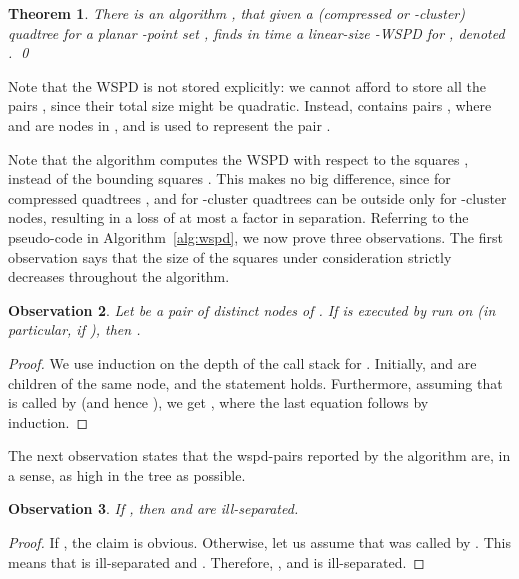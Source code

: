 \documentclass[11pt]{paper}
\newtheorem {theorem} {Theorem}[section]
\newtheorem {observation}[theorem] {Observation}
\begin{document}
    \begin{theorem}\label{thm:wspd}
       There is an algorithm \emph{}, that given a 
       (compressed or -cluster) 
       quadtree  for a planar -point set , finds in time 
       a linear-size -WSPD for , denoted \emph{}.
       \qed
    \end{theorem}


    Note that the WSPD is not stored explicitly: we cannot afford to
    store all the pairs , since their total size might be
    quadratic. Instead,  contains pairs , where 
    and  are nodes in , and   is used to represent
    the pair . 



    Note that the algorithm computes the WSPD with respect to the squares
    , instead of the bounding squares . This makes no big difference,
    since for compressed quadtrees , and for
    -cluster quadtrees  can be outside  only for
    -cluster nodes, resulting in a loss of at most a factor 
    in separation. 
    Referring to the pseudo-code in Algorithm~\ref{alg:wspd}, 
    we now prove three observations. The first observation says
    that the size of the squares under consideration strictly 
    decreases throughout the algorithm.

    \begin{observation} \label{obs:parents-bigger}
    Let  be a pair of distinct nodes of . If 
    \emph{}
    is executed by \emph{} run
    on  (in particular, if \emph{}),
    then .
    \end{observation}


    \begin{proof}
    We use induction on the depth of the call stack for
    . Initially,  and  are children 
    of the same node, and the statement holds.
    Furthermore, assuming that  is called by
     (and hence ), we get
    ,
    where the last equation follows by induction.
    \end{proof}

    The next observation states that the wspd-pairs reported by the
    algorithm are, in a sense, as high in the tree as possible.
    \begin{observation}\label{obs:parents-not-ws}
    If \emph{},
    then  and  are ill-separated.
    \end{observation}

    \begin{proof}
    If , the claim is obvious. Otherwise, let us assume
    that  was  called by . This means
    that  is ill-separated and
    .
    Therefore, 
    ,  and  is ill-separated.
    \end{proof}
\end{document}
